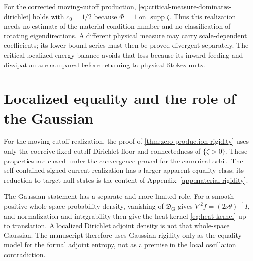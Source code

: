 \documentclass[11pt]{amsart}
\numberwithin{equation}{section}
\theoremstyle{plain}
\theoremstyle{definition}
\theoremstyle{remark}
\newcommand{\supp}{\operatorname{supp}}
\begin{document}
For the corrected moving-cutoff production,
\eqref{eq:critical-measure-dominates-dirichlet} holds with
\(c_0=1/2\) because \(\Phi=1\) on \(\supp\zeta\).  Thus this realization
needs no estimate of the material condition number and no
classification of rotating eigendirections.  A different physical measure
may carry scale-dependent coefficients; its lower-bound series must then be
proved divergent separately.  The critical localized-energy balance avoids that loss because
its inward feeding and dissipation are compared before returning to physical
Stokes units.

\section{Localized equality and the role of the Gaussian}
\label{app:rigidity}

For the moving-cutoff realization, the proof of
\cref{thm:zero-production-rigidity} uses only the coercive fixed-cutoff
Dirichlet floor and connectedness of \(\{\zeta>0\}\).  These properties are
closed under the convergence proved for the canonical orbit.  The
self-contained signed-current realization has a larger apparent equality class;
its reduction to target-null states is the content of
Appendix~\ref{app:material-rigidity}.

The Gaussian statement has a separate and more limited role.  For a smooth
positive whole-space probability density, vanishing of
\(\mathfrak D_{\mathrm G}\) gives
\(\nabla^2f=(2\nu\theta)^{-1}I\), and normalization and integrability then
give the heat kernel \eqref{eq:heat-kernel} up to translation.  A localized
Dirichlet adjoint density is not that whole-space Gaussian.  The manuscript
therefore uses Gaussian rigidity only as the equality model for the formal
adjoint entropy, not as a premise in the local oscillation contradiction.
\end{document}
